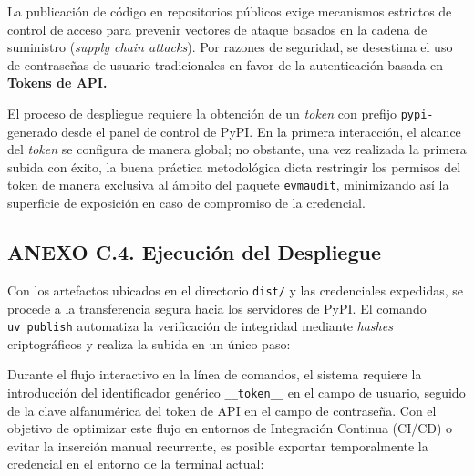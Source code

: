 La publicación de código en repositorios públicos exige mecanismos
estrictos de control de acceso para prevenir vectores de ataque basados
en la cadena de suministro (\emph{supply chain attacks}). Por razones de
seguridad, se desestima el uso de contraseñas de usuario tradicionales
en favor de la autenticación basada en \textbf{Tokens de API.}

El proceso de despliegue requiere la obtención de un \emph{token} con
prefijo \texttt{pypi-} generado desde el panel de control de PyPI. En la
primera interacción, el alcance del \emph{token} se configura de manera
global; no obstante, una vez realizada la primera subida con éxito, la
buena práctica metodológica dicta restringir los permisos del token de
manera exclusiva al ámbito del paquete \texttt{evmaudit}, minimizando
así la superficie de exposición en caso de compromiso de la credencial.

\subsection{ANEXO C.4. Ejecución del
Despliegue}\label{anexo-c.4.-ejecuciuxf3n-del-despliegue}

Con los artefactos ubicados en el directorio \texttt{dist/} y las
credenciales expedidas, se procede a la transferencia segura hacia los
servidores de PyPI. El comando \texttt{uv\ publish} automatiza la
verificación de integridad mediante \emph{hashes} criptográficos y
realiza la subida en un único paso:

\begin{Shaded}
\begin{Highlighting}[]
\end{Highlighting}
\end{Shaded}

Durante el flujo interactivo en la línea de comandos, el sistema
requiere la introducción del identificador genérico
\texttt{\_\_token\_\_} en el campo de usuario, seguido de la clave
alfanumérica del token de API en el campo de contraseña. Con el objetivo
de optimizar este flujo en entornos de Integración Continua (CI/CD) o
evitar la inserción manual recurrente, es posible exportar temporalmente
la credencial en el entorno de la terminal actual:

\begin{Shaded}
\begin{Highlighting}[]
 \OperatorTok{=}
\end{Highlighting}
\end{Shaded}

